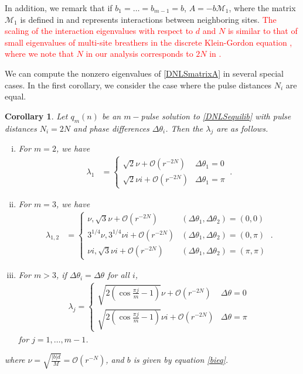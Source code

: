 \documentclass[12pt]{elsarticle}
\newtheorem{corollary}{Corollary}
\newcommand{\revised}[1]{ \textcolor{red}{#1} }
\begin{document}
\noindent In addition, we remark that if $b_1 = \dots = b_{m-1} = b$, $A = -b \mathcal{M}_1$, where the matrix $\mathcal{M}_1$ is defined in \cite[(2.84)]{Kevrekidis2009} and represents interactions between neighboring sites. \revised{The scaling of the interaction eigenvalues with respect to $d$ and $N$ is similar to that of small eigenvalues of multi-site breathers in the discrete Klein-Gordon equation \cite[Lemma 2]{Pelinovsky2012}, where we note that $N$ in our analysis corresponds to $2N$ in \cite{Pelinovsky2012}.}

We can compute the nonzero eigenvalues of \cref{DNLSmatrixA} in several special cases. In the first corollary, we consider the case where the pulse distances $N_i$ are equal.

\begin{corollary}\label{DNLSeigcorr}
Let $q_m(n)$ be an $m-$pulse solution to \cref{DNLSequilib} with pulse distances $N_i = 2N$ and phase differences $\Delta\theta_i$. Then the $\lambda_j$ are as follows.
\begin{enumerate}[(i)]
\item For $m = 2$, we have
\begin{align}\label{2pulseeigs}
\lambda_1 &= 
\begin{cases}
\sqrt{2}\nu  + \mathcal{O}(r^{-2N}) & \Delta\theta_1 = 0 \\
\sqrt{2}\nu i + \mathcal{O}(r^{-2N}) & \Delta\theta_1 = \pi
\end{cases} \:.
\end{align}
\item For $m = 3$, we have
\begin{align}\label{3pulseequaleigs}
\lambda_{1, 2} &= \begin{cases}
\nu, \sqrt{3} \nu + \mathcal{O}(r^{-2N}) & (\Delta\theta_1, \Delta\theta_2) = (0, 0) \\
3^{1/4}\nu, 3^{1/4}\nu i + \mathcal{O}(r^{-2N}) & (\Delta\theta_1, \Delta\theta_2) = (0, \pi) \\
\nu i, \sqrt{3} \nu i + \mathcal{O}(r^{-2N}) & (\Delta\theta_1, \Delta\theta_2) = (\pi, \pi)
\end{cases}\:.
\end{align}
\item For $m > 3$, if $\Delta\theta_i = \Delta\theta$ for all $i$,
\begin{align*}
\lambda_j = \begin{cases}
\sqrt{2\left( \cos\frac{\pi j}{m} - 1 \right)}\nu + \mathcal{O}(r^{-2N}) & \Delta\theta = 0 \\
\sqrt{2\left( \cos\frac{\pi j}{m} - 1 \right)}\nu i + \mathcal{O}(r^{-2N}) & \Delta\theta = \pi
\end{cases}
\end{align*}
for $j = 1, \dots, m-1$.
\end{enumerate}
where $\nu = \sqrt{\frac{|b|d}{M}} = \mathcal{O}(r^{-N})$, and $b$ is given by equation \cref{bieq}.
\end{corollary}
\end{document}
